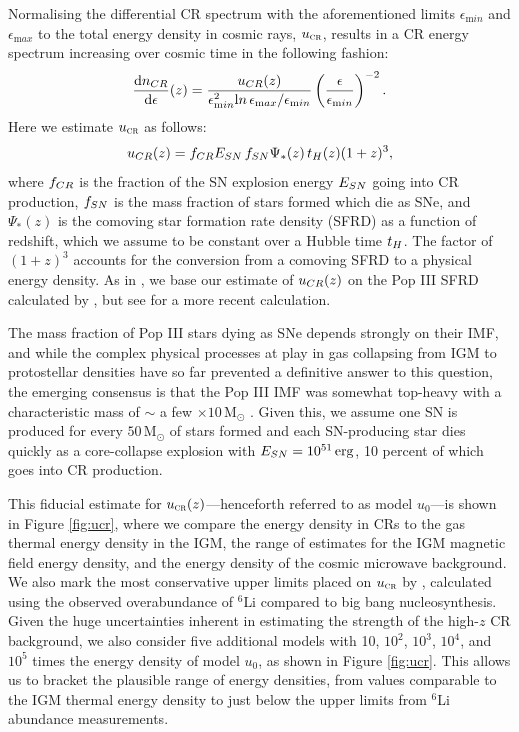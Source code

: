 \documentclass{thesis}
\newcommand{\msun}{\ensuremath{\,\mathrm{M}_{\odot}}\xspace}
\newcommand{\erg}{\ensuremath{\,\mathrm{erg}}\xspace}
\newcommand{\ucr}{\ensuremath{{u}_{\textsc{cr}}}\xspace}
\newcommand{\ucrz}{\ensuremath{{u}_{\textsc{cr}}(z)}\xspace}
\begin{document}
Normalising the differential CR spectrum with the aforementioned limits $\epsilon_{\mathrm min}$ and $\epsilon_{\mathrm max}$ to the total energy density in cosmic rays, $\ucr$, results in a CR energy spectrum increasing over cosmic time in the following fashion:
 \begin{equation}
 \frac{{\mathrm d}n_{\mathrm \small CR}}{{\mathrm d}\epsilon}(z) = \frac{u_{\mathrm \small CR}(z)}{\epsilon_{\mathrm min}^2{\mathrm ln}\,\epsilon_{\mathrm max}{\large /}\epsilon_{\mathrm min}}  \left( \frac{\epsilon}{\epsilon_{\mathrm min}} \right)^{-2}.
 \end{equation}
Here we estimate $\ucr$ as follows:
\begin{equation}
u_{\mathrm \small CR}(z) = f_{\mathrm \small CR} E_{\mathrm \small SN}\, f_{\mathrm \small SN} \Psi_{*}(z)\, t_{\mathrm \small H}(z) (1+z)^3,
\end{equation}
where $f_{\mathrm \small CR}$ is the fraction of the SN explosion energy $E_{\mathrm \small SN}$ going into CR production, $f_{\mathrm \small SN}$ is the mass fraction of stars formed which die as SNe, and $\Psi_{*}(z)$ is the comoving star formation rate density (SFRD) as a function of redshift, which we assume to be constant over a Hubble time $t_{\mathrm \small H}$. 
The factor of $(1+z)^3$ accounts for the conversion from a comoving SFRD to a physical energy density. As in \citet{Hummeletal2015}, we base our estimate of $u_{\mathrm \small CR}(z)$ on the Pop III SFRD calculated by \citet{GreifBromm2006}, but see \citet{Campisietal2011} for a more recent calculation. 

The mass fraction of Pop III stars dying as SNe depends strongly on their IMF, and while the complex physical processes at play in gas collapsing from IGM to protostellar densities have so far prevented a definitive answer to this question, the emerging consensus is that the Pop III IMF was somewhat top-heavy with a characteristic mass of $\sim$ a few $\times 10\msun$ \citep{Bromm2013}.  
Given this, we assume one SN is produced for every $50\msun$ of stars formed and each SN-producing star dies quickly as a core-collapse explosion with $E_{\mathrm \small SN} = 10^{51}\erg$, 10 percent of which goes into CR production.  

This fiducial estimate for $\ucrz$---henceforth referred to as model $u_0$---is shown in Figure \ref{fig:ucr}, where we compare the energy density in CRs to the gas thermal energy density in the IGM, the range of estimates for the IGM magnetic field energy density, and the energy density of the cosmic microwave background. 
We also mark the most conservative upper limits placed on $\ucr$ by \citet{RollindeVangioniOlive2006}, calculated using the observed overabundance of $^6$Li compared to big bang nucleosynthesis. 
Given the huge uncertainties inherent in estimating the strength of the high-$z$ CR background, we also consider five additional models with 10, $10^2$, $10^3$, $10^4$, and $10^5$ times the energy density of model $u_0$, as shown in Figure \ref{fig:ucr}.  
This allows us to bracket the plausible range of energy densities, from values comparable to the IGM thermal energy density to just below the upper limits from $^6$Li abundance measurements.
 
\end{document}
